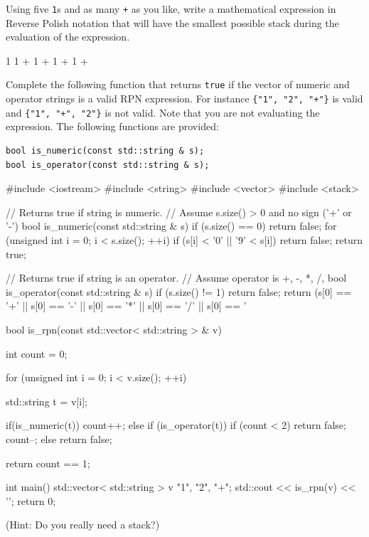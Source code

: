 \nextq
Using five \verb!1!s and as many \verb!+! as you like,
write a mathematical expression in Reverse Polish notation
that will have the smallest possible
stack during the evaluation of the expression.
\\
\ANSWER
\begin{answercode}
1 1 + 1 + 1 + 1 +
\end{answercode}

\nextq
Complete the following function that returns \verb!true! if the vector
of numeric and operator strings is a valid RPN expression.
For instance \verb!{"1", "2", "+"}! is valid and
\verb!{"1", "+", "2"}! is not valid.
Note that you are not evaluating the expression.
The following functions are provided:
\begin{Verbatim}[fontsize=\footnotesize,frame=single]
bool is_numeric(const std::string & s);
bool is_operator(const std::string & s);
\end{Verbatim}
\ANSWER
\begin{answercode}
#include <iostream>
#include <string>
#include <vector>
#include <stack>

// Returns true if string is numeric.
// Assume s.size() > 0 and no sign ('+' or '-')
bool is_numeric(const std::string & s)
{
    if (s.size() == 0) return false;
    for (unsigned int i = 0; i < s.size(); ++i)
    {
        if (s[i] < '0' || '9' < s[i])
        {
            return false;
        }
    }
    return true;
}

// Returns true if string is an operator.
// Assume operator is +, -, *, /, %
bool is_operator(const std::string & s)
{
    if (s.size() != 1) return false;
    return (s[0] == '+' || s[0] == '-' || s[0] == '*' || s[0] == '/' ||
            s[0] == '%
}

bool is_rpn(const std::vector< std::string > & v)
{
  int count = 0;
  
  for (unsigned int i = 0; i < v.size(); ++i)
  {
    std::string t = v[i];

    if(is_numeric(t))
    {
      count++;
    }
    else if (is_operator(t))
    {
      if (count < 2)
          return false;
      count--;
    }
    else
    {
      return false;
    }
  }
  return count == 1;
}

int main()
{
    std::vector< std::string > v {"1", "2", "+"};
    std::cout << is_rpn(v) << '\n';
    return 0;
}
\end{answercode}
(Hint: Do you really need a stack?)


